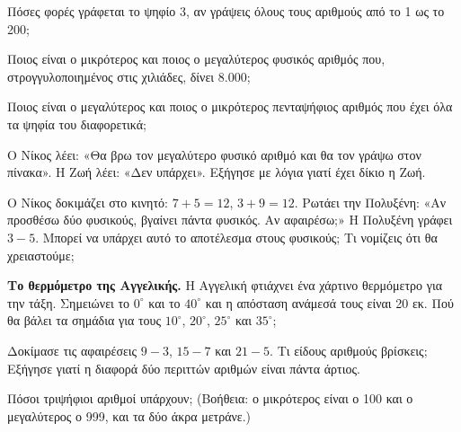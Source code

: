 
\ex Πόσες φορές γράφεται το ψηφίο 3, αν γράψεις όλους τους αριθμούς από το 1 ως το 200;

\ex Ποιος είναι ο μικρότερος και ποιος ο μεγαλύτερος φυσικός αριθμός που, στρογγυλοποιημένος στις χιλιάδες, δίνει 8.000;

\ex Ποιος είναι ο μεγαλύτερος και ποιος ο μικρότερος πενταψήφιος αριθμός που έχει όλα τα ψηφία του διαφορετικά;

\ex Ο Νίκος λέει: «Θα βρω τον μεγαλύτερο φυσικό αριθμό και θα τον γράψω στον πίνακα». Η Ζωή λέει: «Δεν υπάρχει». Εξήγησε με λόγια γιατί έχει δίκιο η Ζωή.

\ex Ο Νίκος δοκιμάζει στο κινητό: $7+5=12$, $3+9=12$. Ρωτάει την Πολυξένη: «Αν προσθέσω δύο φυσικούς, βγαίνει πάντα φυσικός. Αν αφαιρέσω;» Η Πολυξένη γράφει $3-5$. Μπορεί να υπάρχει αυτό το αποτέλεσμα στους φυσικούς; Τι νομίζεις ότι θα χρειαστούμε;


\ex \textbf{Το θερμόμετρο της Αγγελικής.} Η Αγγελική φτιάχνει ένα χάρτινο θερμόμετρο για την τάξη. Σημειώνει το $0^\circ$ και το $40^\circ$ και η απόσταση ανάμεσά τους είναι 20 εκ. Πού θα βάλει τα σημάδια για τους $10^\circ$, $20^\circ$, $25^\circ$ και $35^\circ$;

\ex Δοκίμασε τις αφαιρέσεις $9-3$, $15-7$ και $21-5$. Τι είδους αριθμούς βρίσκεις; Εξήγησε γιατί η διαφορά δύο περιττών αριθμών είναι πάντα άρτιος.

\ex Πόσοι τριψήφιοι αριθμοί υπάρχουν; (Βοήθεια: ο μικρότερος είναι ο 100 και ο μεγαλύτερος ο 999, και τα δύο άκρα μετράνε.)
